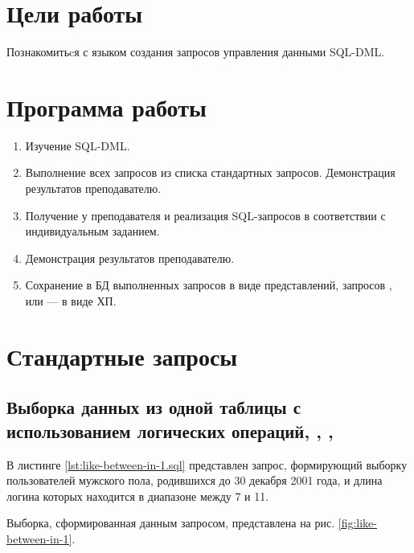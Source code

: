 





\tableofcontents
\newpage

\section{Цели работы}

Познакомитьcя с языком создания запросов управления данными SQL-DML. 

\section{Программа работы}

\begin{enumerate}
	\item Изучение SQL-DML.
	\item Выполнение всех запросов из списка стандартных запросов. Демонстрация результатов преподавателю.
	\item Получение у преподавателя и реализация SQL-запросов в соответствии с индивидуальным заданием. 			\item Демонстрация результатов преподавателю.
	\item Сохранение в БД выполненных запросов  в виде представлений, запросов ,  или  --- в виде ХП.
 
\end{enumerate}
 
\section{Стандартные запросы} 

\subsection{Выборка данных из одной таблицы с использованием логических операций, , , }

В листинге \ref{lst:like-between-in-1.sql} представлен запрос, формирующий выборку пользователей мужского пола, родившихся до 30 декабря 2001 года, и длина логина которых находится в диапазоне между 7 и 11.


 
Выборка, сформированная данным запросом, представлена на рис. \ref{fig:like-between-in-1}.

